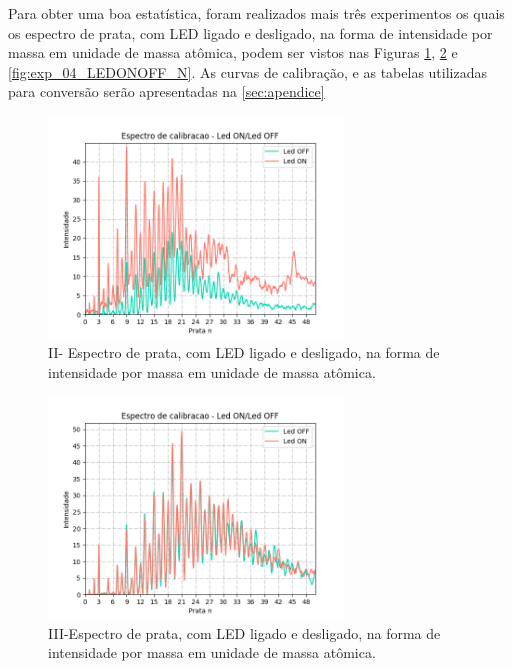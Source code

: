 Para obter uma boa estatística, foram realizados mais três experimentos os quais os espectro de prata, com LED ligado e desligado, na forma de intensidade por massa em unidade de massa atômica, podem ser vistos nas Figuras \ref{fig:exp_02_LEDONOFF_N}, \ref{fig:exp_03_LEDONOFF_N} e \ref{fig:exp_04_LEDONOFF_N}. As curvas de calibração, e as tabelas utilizadas para conversão serão apresentadas na \ref{sec:apendice}

\begin{figure}
  \centering  
  \includegraphics[width=0.7\textwidth]{exp_02/LED_ON_Led_OFF_espectro_calib_prata_N_.png}
  \caption{II- Espectro de prata, com LED ligado e desligado, na forma de intensidade por massa em unidade de massa atômica.}
  \label{fig:exp_02_LEDONOFF_N}
\end{figure}

\begin{figure}
  \centering  
  \includegraphics[width=0.7\textwidth]{exp_03/LED_ON_Led_OFF_espectro_calib_prata_N_.png}
  \caption{III-Espectro de prata, com LED ligado e desligado, na forma de intensidade por massa em unidade de massa atômica.}
  \label{fig:exp_03_LEDONOFF_N}
\end{figure}

